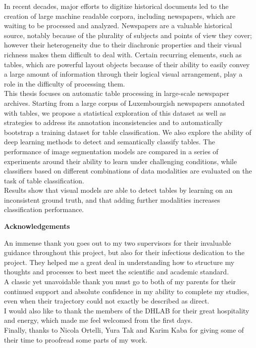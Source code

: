 \documentclass[11pt,preprint]{report}
\renewenvironment{abstract}
 {\cleardoublepage\thispagestyle{empty}\null\vfill
  \begin{center}
  \bfseries \abstractname\vspace{-.5em}\vspace{0pt}
  \end{center}
  \list{}{
    \setlength{\leftmargin}{3cm}%
    \setlength{\rightmargin}{\leftmargin}%
  }%
  \item\relax}
 {\vfill\null}
 {\endlist}
\newenvironment{acknowledgements}
 {\cleardoublepage\thispagestyle{empty}\null\vfill
  \begin{center}
  \bfseries Acknowledgements\vspace{-.5em}\vspace{0pt}
  \end{center}
  \list{}{
    \setlength{\leftmargin}{2.5cm}%
    \setlength{\rightmargin}{\leftmargin}%
  }%
  \item\relax}
{\vfill\null}
{\endlist}
\begin{document}
\begin{abstract}
In recent decades, major efforts to digitize historical documents led to the creation of large machine readable corpora, including newspapers, which are waiting to be processed and analyzed. Newspapers are a valuable historical source, notably because of the plurality of subjects and points of view they cover; however their heterogeneity due to their diachronic properties and their visual richness makes them difficult to deal with. Certain recurring elements, such as tables, which are powerful layout objects because of their ability to easily convey a large amount of information through their logical visual arrangement, play a role in the difficulty of processing them. \\
This thesis focuses on automatic table processing in large-scale newspaper archives. Starting from a large corpus of Luxembourgish newspapers annotated with tables, we propose a statistical exploration of this dataset as well as strategies to address its annotation inconsistencies and to automatically bootstrap a training dataset for table classification. We also explore the ability of deep learning methods to detect and semantically classify tables. The performance of image segmentation models are compared in a series of experiments around their ability to learn under challenging conditions, while classifiers based on different combinations of data modalities are evaluated on the task of table classification. \\
Results show that visual models are able to detect tables by learning on an inconsistent ground truth, and that adding further modalities increases classification performance. 
\end{abstract}

\begin{acknowledgements}
An immense thank you goes out to my two supervisors for their invaluable guidance throughout this project, but also for their infectious dedication to the project. They helped me a great deal in understanding how to structure my thoughts and processes to best meet the scientific and academic standard.\\
A classic yet unavoidable thank you must go to both of my parents for their continued support and absolute confidence in my ability to complete my studies, even when their trajectory could not exactly be described as direct.\\
I would also like to thank the members of the DHLAB for their great hospitality and energy, which made me feel welcomed from the first days.\\
Finally, thanks to Nicola Ortelli, Yura Tak and Karim Kaba for giving some of their time to proofread some parts of my work.
\end{acknowledgements}

\tableofcontents













\printbibliography
\end{document}
